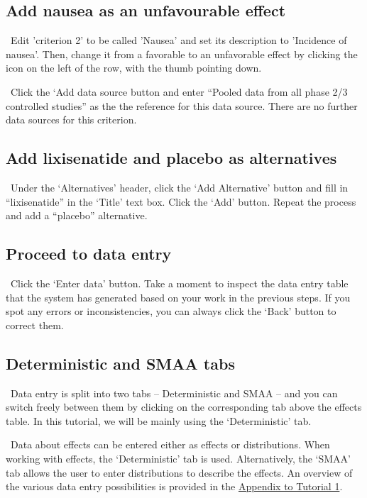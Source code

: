 \documentclass[00_mcda_tutorial.tex]{subfiles}
\begin{document}
\subsection*{Add nausea as an unfavourable effect}
\noindent \leftpointright \, Edit 'criterion 2' to be called 'Nausea' and set its description to 'Incidence of nausea'. Then, change it from a favorable to an unfavorable effect by clicking the icon on the left of the row, with the thumb pointing down.
\newline

\noindent \leftpointright \, Click the ‘Add data source button and enter “Pooled data from all phase 2/3 controlled studies” as the the reference for this data source.  There are no further data sources for this criterion.

\subsection*{Add lixisenatide and placebo as alternatives}
\noindent \leftpointright \, Under the ‘Alternatives’ header, click the ‘Add Alternative’ button and fill in “lixisenatide” in the ‘Title’ text box. Click the ‘Add’ button. Repeat the process and add a “placebo” alternative.

\subsection*{Proceed to data entry}
\noindent \leftpointright \, Click the ‘Enter data’ button. Take a moment to inspect the data entry table that the system has generated based on your work in the previous steps. If you spot any errors or inconsistencies, you can always click the ‘Back’ button to correct them.

\subsection*{Deterministic and SMAA tabs}
\noindent \faLightbulbO \, Data entry is split into two tabs – Deterministic and SMAA – and you can switch freely between them by clicking on the corresponding tab above the effects table. In this tutorial, we will be mainly using the ‘Deterministic’ tab.
\newline

\noindent \faGraduationCap \, Data about effects can be entered either as effects or distributions. When working with effects, the ‘Deterministic’ tab is used. Alternatively, the ‘SMAA’ tab allows the user to enter distributions to describe the effects. An overview of the various data entry possibilities is provided in the \hyperref[appendix1]{Appendix to Tutorial 1}.
\end{document}
